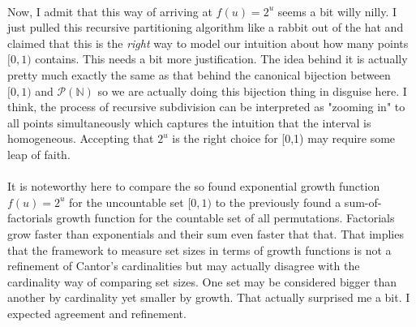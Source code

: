 \documentclass[12pt]{article}
\begin{document}

\paragraph{}
Now, I admit that this way of arriving at $f(u) = 2^u$ seems a bit willy nilly. I just pulled this recursive partitioning algorithm like a rabbit out of the hat and claimed that this is the \emph{right} way to model our intuition about how many points $[0,1)$ contains. This needs a bit more justification. The idea behind it is actually pretty much exactly the same as that behind the canonical bijection between $[0,1)$ and $\mathcal{P}(\mathbb{N})$ so we are actually doing this bijection thing in disguise here. I think, the process of recursive subdivision can be interpreted as "zooming in" to all points simultaneously which captures the intuition that the interval is homogeneous. Accepting that $2^u$ is the right choice for [0,1) may require some leap of faith.

\paragraph{}
It is noteworthy here to compare the so found exponential growth function $f(u) = 2^u$ for the uncountable set $[0,1)$ to the previously found a sum-of-factorials growth function for the countable set of all permutations. Factorials grow faster than exponentials and their sum even faster that that. That implies that the framework to measure set sizes in terms of growth functions is not a refinement of Cantor's cardinalities but may actually disagree with the cardinality way of comparing set sizes. One set may be considered bigger than another by cardinality yet smaller by growth. That actually surprised me a bit. I expected agreement and refinement.

\end{document}
